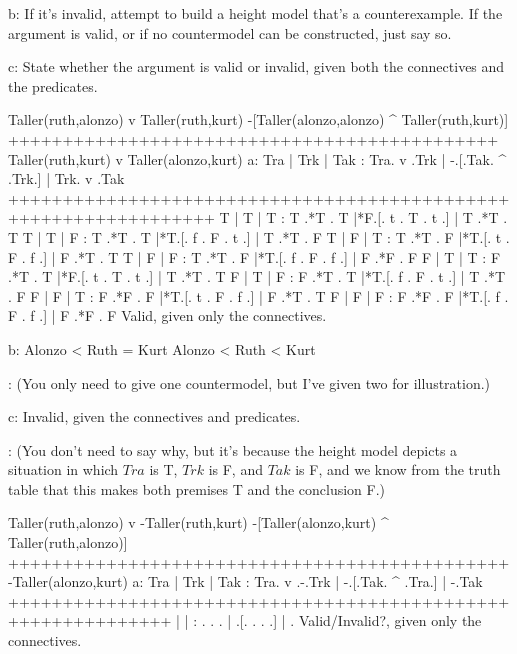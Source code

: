 b: If it's invalid, attempt to build a height model that's a counterexample. If the argument is valid, or if no countermodel can be constructed, just say so.

c: State whether the argument is valid or invalid, given both the connectives and the predicates.
\endlist

\problems
{}
\argument
 Taller(ruth,alonzo) v Taller(ruth,kurt)
 -[Taller(alonzo,alonzo) ^ Taller(ruth,kurt)]
+++++++++++++++++++++++++++++++++++++++++++++
 Taller(ruth,kurt) v Taller(alonzo,kurt)
\endargument
        \answerlist
        a:
        \truthtable
         Tra | Trk | Tak : Tra. v .Trk | -.[.Tak. ^ .Trk.] | Trk. v .Tak
        +++++++++++++++++++++++++++++++++++++++++++++++++++++++++++++++++
          T  |  T  |  T  :  T .*T . T  |*F.[. t . T . t .] |  T .*T . T
          T  |  T  |  F  :  T .*T . T  |*T.[. f . F . t .] |  T .*T . F
          T  |  F  |  T  :  T .*T . F  |*T.[. t . F . f .] |  F .*T . T
          T  |  F  |  F  :  T .*T . F  |*T.[. f . F . f .] |  F .*F . F
          F  |  T  |  T  :  F .*T . T  |*F.[. t . T . t .] |  T .*T . T
          F  |  T  |  F  :  F .*T . T  |*T.[. f . F . t .] |  T .*T . F
          F  |  F  |  T  :  F .*F . F  |*T.[. t . F . f .] |  F .*T . T
          F  |  F  |  F  :  F .*F . F  |*T.[. f . F . f .] |  F .*F . F
        \endtruthtable
        Valid, given only the connectives.

        b:
        \heightmodel
         Alonzo < Ruth = Kurt
        \endheightmodel
        \OR
        \heightmodel
         Alonzo < Ruth < Kurt
        \endheightmodel

:       (You only need to give one countermodel, but I've given two for illustration.)

        c: Invalid, given the connectives and predicates.

:       (You don't need to say why, but it's because the height model depicts a situation in which $Tra$ is T, $Trk$ is F, and $Tak$ is F, and we know from the truth table that this makes both premises T and the conclusion F.)
        \endanswerlist

\argument
 Taller(ruth,alonzo) v -Taller(ruth,kurt)
 -[Taller(alonzo,kurt) ^ Taller(ruth,alonzo)]
++++++++++++++++++++++++++++++++++++++++++++++
 -Taller(alonzo,kurt)
\endargument
        \answerlist
        a:
        \truthtable
         Tra | Trk | Tak : Tra. v .-.Trk | -.[.Tak. ^ .Tra.] | -.Tak
        +++++++++++++++++++++++++++++++++++++++++++++++++++++++++++++
             |     |     :    .   . .    |  .[.   .   .   .] |  .  
        \endtruthtable
        Valid/Invalid?, given only the connectives.

